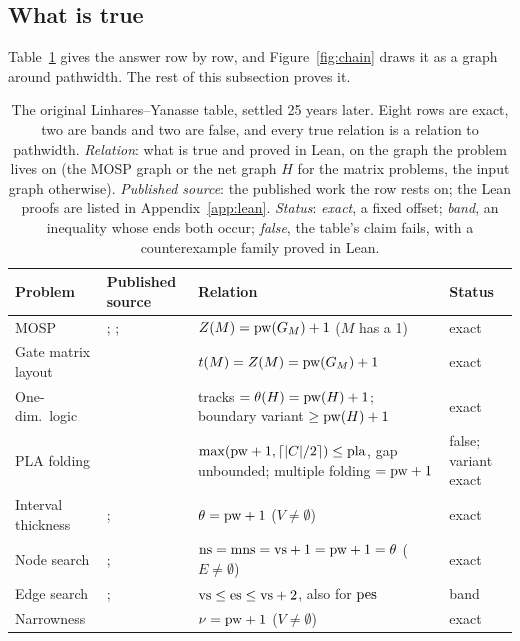 \subsection{What is true}
\label{sec:true}

Table~\ref{tab:master} gives the answer row by row, and
Figure~\ref{fig:chain} draws it as a graph around pathwidth. The rest of this
subsection proves it.

\begin{table}[tbp]
\centering\small
\caption{The original Linhares--Yanasse table, settled 25 years later. Eight rows are exact, two are
bands and two are false, and every true relation is a relation to pathwidth.
\emph{Relation}: what is true and proved in Lean, on the graph the problem
lives on (the MOSP graph or the net graph $H$ for the matrix problems, the input
graph otherwise). \emph{Published source}: the published work the row rests on; the
Lean proofs are listed in Appendix~\ref{app:lean}. \emph{Status}: \emph{exact}, a fixed
offset; \emph{band}, an inequality whose ends both occur; \emph{false}, the
table's claim fails, with a counterexample family proved in Lean.}
\label{tab:master}
\begin{tabularx}{\linewidth}{@{}>{\raggedright}p{2.7cm}>{\raggedright}p{3.4cm}>{\raggedright\arraybackslash}X l@{}}
\toprule
Problem & Published source & Relation & Status \\
\midrule
MOSP & \citet{Yanasse1997a}; \citet{FellowsLangston1989}; \citet{LY2002} &
  $Z(M)=\mathrm{pw}(G_M)+1$ ($M$ has a 1) & exact \\
Gate matrix layout & \citet{LY2002ref6} & $t(M)=Z(M)=\mathrm{pw}(G_M)+1$ & exact \\
One-dim.\ logic & \citet{LY2002ref7} & tracks $=\theta(H)=\mathrm{pw}(H)+1$; boundary variant $\ge\mathrm{pw}(H)+1$ & exact \\
PLA folding & \citet{LY2002ref6} & $\max(\mathrm{pw}+1,\lceil|C|/2\rceil)\le\mathrm{pla}$, gap unbounded; multiple folding $=\mathrm{pw}+1$ & false; variant exact \\
Interval thickness & \citet{LY2002ref6}; \citet{LY2002ref9} & $\theta=\mathrm{pw}+1$ ($V\ne\emptyset$) & exact \\
Node search & \citet{LY2002ref9,LY2002ref10}; \citet{BienstockSeymour1991} & $\mathrm{ns}=\mathrm{mns}=\mathrm{vs}+1=\mathrm{pw}+1=\theta$ ($E\ne\emptyset$) & exact \\
Edge search & \citet{EllisSudboroughTurner1994}; \citet{LY2002ref10} & $\mathrm{vs}\le\mathrm{es}\le\mathrm{vs}+2$, also for $\mathrm{pes}$ & band \\
Narrowness & \citet{LY2002ref11} & $\nu=\mathrm{pw}+1$ ($V\ne\emptyset$) & exact \\

\end{tabularx}
\end{table}
